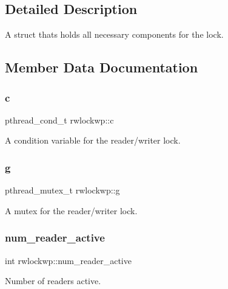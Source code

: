 \subsection{Detailed Description}
A struct thats holds all necessary components for the lock. 

\subsection{Member Data Documentation}
\mbox{\label{structrwlockwp_acc2d2410bf5f9e811503673564745037}} 
\subsubsection{\texorpdfstring{c}{c}}
{\footnotesize\ttfamily pthread\+\_\+cond\+\_\+t rwlockwp\+::c}



A condition variable for the reader/writer lock. 

\mbox{\label{structrwlockwp_aadde32e3b40cb009fe22e7971c612d40}} 
\subsubsection{\texorpdfstring{g}{g}}
{\footnotesize\ttfamily pthread\+\_\+mutex\+\_\+t rwlockwp\+::g}



A mutex for the reader/writer lock. 

\mbox{\label{structrwlockwp_a3de1a0126b2eb5687577561e23c9f153}} 
\subsubsection{\texorpdfstring{num\+\_\+reader\+\_\+active}{num\_reader\_active}}
{\footnotesize\ttfamily int rwlockwp\+::num\+\_\+reader\+\_\+active}



Number of readers active. 

\mbox{\label{structrwlockwp_a6142e0315230df07be53a757b1341ea0}} 
